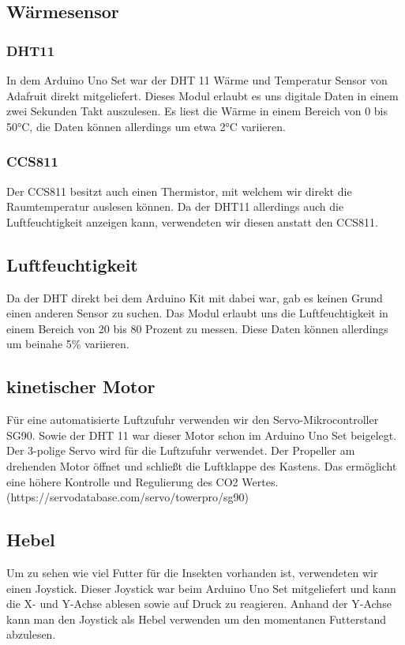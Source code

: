 \subsection{Wärmesensor}

\subsubsection{DHT11}

In dem Arduino Uno Set war der DHT 11 Wärme und Temperatur Sensor von Adafruit direkt mitgeliefert. Dieses Modul erlaubt es uns digitale Daten in einem zwei Sekunden Takt auszulesen. Es liest die Wärme in einem Bereich von 0 bis 50°C, die Daten können allerdings um etwa 2°C variieren.

\subsubsection{CCS811}

Der CCS811 besitzt auch einen Thermistor, mit welchem wir direkt die Raumtemperatur auslesen können. Da der DHT11 allerdings auch die Luftfeuchtigkeit anzeigen kann, verwendeten wir diesen anstatt den CCS811. 
\cite{CCS811man}

\subsection{Luftfeuchtigkeit}

Da der DHT direkt bei dem Arduino Kit mit dabei war, gab es keinen Grund einen anderen Sensor zu suchen. Das Modul erlaubt uns die Luftfeuchtigkeit in einem Bereich von 20 bis 80 Prozent zu messen. Diese Daten können allerdings um beinahe 5\% variieren.  

\subsection{kinetischer Motor}

Für eine automatisierte Luftzufuhr verwenden wir den Servo-Mikrocontroller SG90. Sowie der DHT 11 war dieser Motor schon im Arduino Uno Set beigelegt. Der 3-polige Servo wird für die Luftzufuhr verwendet. Der Propeller am drehenden Motor öffnet und schließt die Luftklappe des Kastens. Das ermöglicht eine höhere Kontrolle und Regulierung des CO2 Wertes. (https://servodatabase.com/servo/towerpro/sg90)

\subsection{Hebel}

Um zu sehen wie viel Futter für die Insekten vorhanden ist, verwendeten wir einen Joystick. Dieser Joystick war beim Arduino Uno Set mitgeliefert und kann die X- und Y-Achse ablesen sowie auf Druck zu reagieren. Anhand der Y-Achse kann man den Joystick als Hebel verwenden um den momentanen Futterstand abzulesen. 




